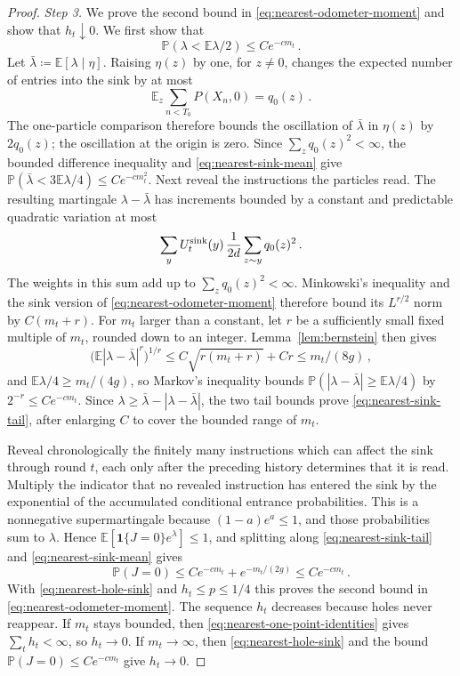 \documentclass[11pt]{amsart}
\theoremstyle{plain}
\theoremstyle{definition}
\newcommand{\E}{\mathbb{E}}
\renewcommand{\P}{\mathbb{P}}
\newcommand{\one}{\mathbf{1}}
\begin{document}
\begin{proof}
	\smallskip
	\noindent\emph{Step 3.} We prove the second bound in
	\eqref{eq:nearest-odometer-moment} and show that $h_t\downarrow0$. We first
	show that
	\begin{equation}\label{eq:nearest-sink-tail}
		\P(\lambda<\E\lambda/2)\leq Ce^{-cm_t}\,.
	\end{equation}
	Let $\bar\lambda\coloneqq\E[\lambda\mid\eta]$. Raising $\eta(z)$ by one,
	for $z\ne0$, changes the expected number of entries into the sink by at most
	\[
		\E_z\sum_{n<T_0}P(X_n,0)=q_0(z)\,.
	\]
	The one-particle comparison therefore bounds the oscillation of
	$\bar\lambda$ in $\eta(z)$ by $2q_0(z)$; the oscillation at the origin is
	zero. Since $\sum_zq_0(z)^2<\infty$, the bounded difference inequality and
	\eqref{eq:nearest-sink-mean} give
	$\P(\bar\lambda<3\E\lambda/4)\leq Ce^{-cm_t^2}$. Next reveal the instructions
	the particles read. The resulting martingale $\lambda-\bar\lambda$ has increments
	bounded by a constant and
	predictable quadratic variation at most
	\[
		\sum_yU^{\rm sink}_t(y)\,\frac1{2d}\sum_{z\sim y}q_0(z)^2\,.
	\]
	The weights in this sum add up to $\sum_zq_0(z)^2<\infty$. Minkowski's
	inequality and the sink version of \eqref{eq:nearest-odometer-moment}
	therefore bound its $L^{r/2}$ norm by $C(m_t+r)$.
	For $m_t$ larger than a constant, let $r$ be a sufficiently small fixed
	multiple of $m_t$, rounded down to an integer. Lemma~\ref{lem:bernstein} then
	gives
	\[
		\bigl(\E|\lambda-\bar\lambda|^r\bigr)^{1/r}
		\leq C\sqrt{r(m_t+r)}+Cr\leq m_t/(8g)\,,
	\]
	and $\E\lambda/4\geq m_t/(4g)$, so Markov's inequality bounds
	$\P(|\lambda-\bar\lambda|\geq\E\lambda/4)$ by
	$2^{-r}\leq Ce^{-cm_t}$. Since
	$\lambda\geq\bar\lambda-|\lambda-\bar\lambda|$, the two tail bounds prove
	\eqref{eq:nearest-sink-tail}, after enlarging $C$ to cover the bounded
	range of $m_t$.

	Reveal chronologically the finitely many instructions which can affect the
	sink through round $t$, each only after the preceding history determines that
	it is read. Multiply the indicator that no revealed instruction has entered
	the sink by the exponential of the accumulated conditional entrance
	probabilities. This is a nonnegative supermartingale because
	$(1-a)e^a\leq1$, and those probabilities sum to $\lambda$. Hence
	$\E[\one\{J=0\}e^\lambda]\leq1$, and splitting along
	\eqref{eq:nearest-sink-tail} and \eqref{eq:nearest-sink-mean} gives
	\[
		\P(J=0)\leq Ce^{-cm_t}+e^{-m_t/(2g)}\leq Ce^{-cm_t}\,.
	\]
	With \eqref{eq:nearest-hole-sink} and $h_t\leq p\leq1/4$ this proves the
	second bound in \eqref{eq:nearest-odometer-moment}. The sequence $h_t$
	decreases because holes never reappear. If $m_t$ stays bounded, then
	\eqref{eq:nearest-one-point-identities} gives $\sum_t h_t<\infty$, so
	$h_t\to0$. If
	$m_t\to\infty$, then \eqref{eq:nearest-hole-sink} and the bound
	$\P(J=0)\leq Ce^{-cm_t}$ give $h_t\to0$.
\end{proof}
\end{document}
